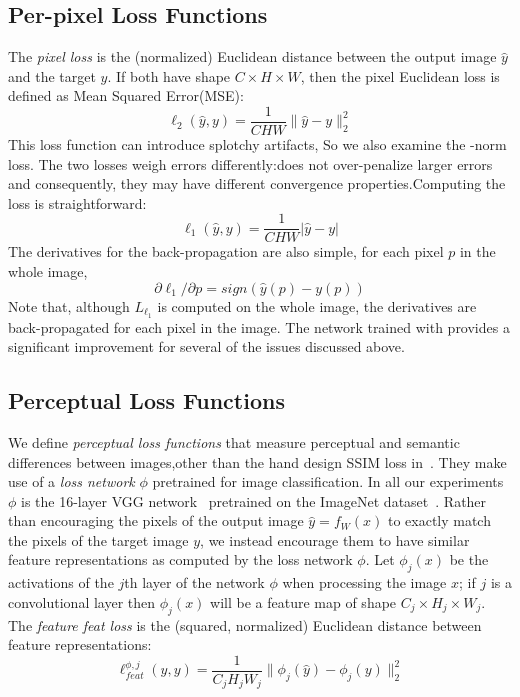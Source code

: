 \subsection{Per-pixel Loss Functions}
The \emph{pixel loss} is the (normalized) Euclidean distance between the output image
$\hat y$ and the target $y$. If both have shape $C\times H\times W$, then the pixel Euclidean loss is
defined as Mean Squared Error(MSE): 
 \begin{equation}
   \ell_2(\hat y, y) = \frac{1}{CHW}\|\hat y - y\|_2^2
  \end{equation}
This loss function can introduce splotchy artifacts, So we also examine the \lone-norm loss. The two losses weigh errors differently:\lone does not over-penalize larger errors and consequently, they may have different convergence properties.Computing the \lone loss is straightforward:
\begin{equation}
\ell_1(\hat y, y) = \frac{1}{CHW}| \hat y - y|
\end{equation}
The derivatives for the back-propagation are also simple,  for each pixel $p$ in the whole image,
\begin{equation}
\partial \ell_1/\partial p  = sign\left(\hat y(p) - y(p)\right)
\end{equation}
Note that, although $L_{\ell_1}$ is computed on the whole image, the derivatives are back-propagated for each pixel in the image. The network trained with \lone provides a significant improvement for several of the issues discussed above.
\subsection{Perceptual Loss Functions}

We define \emph{perceptual loss functions} that measure perceptual and semantic differences between images,other than the hand design SSIM loss in~\cite{Zhao2015}. They make use of a \emph{loss network} $\phi$ pretrained
for image classification. In all our experiments $\phi$ is the 
16-layer VGG network~\cite{Simonyan14c} pretrained on the ImageNet dataset~\cite{Deng2009ImageNet}.
Rather than encouraging the pixels of the output image $\hat y=f_W(x)$ to exactly match
the pixels of the target image $y$, we instead encourage them to have similar feature
representations as computed by the loss network $\phi$. Let $\phi_j(x)$ be the activations
of the $j$th layer of the network $\phi$ when processing the image $x$; if $j$ is a
convolutional layer then $\phi_j(x)$ will be a feature map of shape
$C_j \times H_j \times W_j$. The \emph{feature feat loss} is
the (squared, normalized) Euclidean distance between feature representations:
\begin{equation}
  \ell_{feat}^{\phi,j}(\hat y, y) = 
  \frac1{C_jH_jW_j}\|\phi_j(\hat y) - \phi_j(y)\|_2^2
\end{equation}

